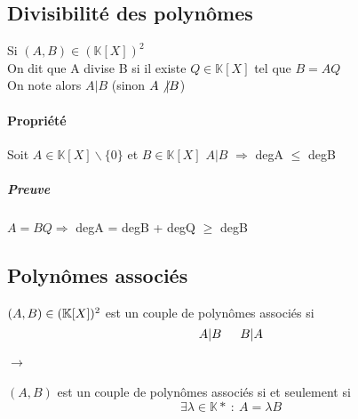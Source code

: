 		\subsection{Divisibilité des polynômes}
			Si $(A,B) \in (\mathbb{K} [X])^{2}$\\
			On dit que A	 divise B si il existe $Q \in\mathbb{K} [X]$ tel que $B=AQ$\\
			On note alors $A\vert B$ (sinon $A\not\vert B$)
			\paragraph{Propriété}
				Soit $A\in\mathbb{K} [X] \backslash\{0\}$ et $B \in\mathbb{K} [X]$
				$A\vert B$ $\Rightarrow$ degA $\leq$ degB
				\subparagraph{Preuve}
				 $A = BQ \Rightarrow$ degA = degB + degQ $\geq$ degB
		\subsection{Polynômes associés}
			$(A,B) \in (\mathbb{K}[X] )^2$ est un couple de polynômes associés si
			\[A\vert B \hspace*{15pt} B\vert A\]
			\paragraph{$\rightarrow$}
				$(A,B)$ est un couple de polynômes associés si et seulement si
				\[\exists\lambda\in\mathbb{K}* ~:~A=\lambda B\]

